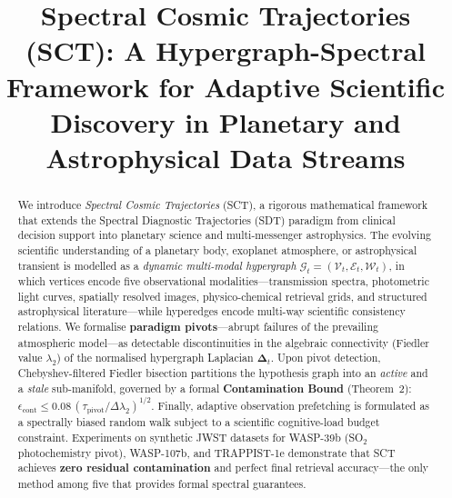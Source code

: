 \documentclass[conference]{IEEEtran}
\newcommand{\lam}{\lambda_2}
\newcommand{\dlam}{\Delta\lambda_2}
\newcommand{\epscont}{\epsilon_{\mathrm{cont}}}
\newcommand{\tpivot}{\tau_{\mathrm{pivot}}}
\newcommand{\Gcal}{\mathcal{G}}
\newcommand{\Vcal}{\mathcal{V}}
\newcommand{\Ecal}{\mathcal{E}}
\newcommand{\Wcal}{\mathcal{W}}
\newcommand{\Deltab}{\boldsymbol{\Delta}}
\begin{document}
\title{Spectral Cosmic Trajectories (SCT): A Hypergraph-Spectral Framework
       for Adaptive Scientific Discovery in Planetary and
       Astrophysical Data Streams}

\author{
  \and
}

\maketitle

\begin{abstract}
We introduce \textit{Spectral Cosmic Trajectories} (SCT), a rigorous
mathematical framework that extends the Spectral Diagnostic Trajectories
(SDT) paradigm from clinical decision support into planetary science and
multi-messenger astrophysics.
The evolving scientific understanding of a planetary body, exoplanet
atmosphere, or astrophysical transient is modelled as a \emph{dynamic
multi-modal hypergraph}
$\Gcal_t = (\Vcal_t, \Ecal_t, \Wcal_t)$,
in which vertices encode five observational modalities---transmission
spectra, photometric light curves, spatially resolved images,
physico-chemical retrieval grids, and structured astrophysical
literature---while hyperedges encode multi-way scientific consistency
relations.
We formalise \textbf{paradigm pivots}---abrupt failures of the prevailing
atmospheric model---as detectable discontinuities in the algebraic
connectivity (Fiedler value $\lam$) of the normalised hypergraph
Laplacian $\Deltab_t$.
Upon pivot detection, Chebyshev-filtered Fiedler bisection partitions the
hypothesis graph into an \emph{active} and a \emph{stale} sub-manifold,
governed by a formal \textbf{Contamination Bound} (Theorem~2):
$\epscont \leq 0.08\,(\tpivot/\dlam)^{1/2}$.
Finally, adaptive observation prefetching is formulated as a
spectrally biased random walk subject to a scientific cognitive-load
budget constraint.
Experiments on synthetic JWST datasets for WASP-39b
(SO$_2$ photochemistry pivot), WASP-107b, and TRAPPIST-1e demonstrate
that SCT achieves \textbf{zero residual contamination} and perfect final
retrieval accuracy---the only method among five that provides formal
spectral guarantees.
\end{abstract}
\end{document}
